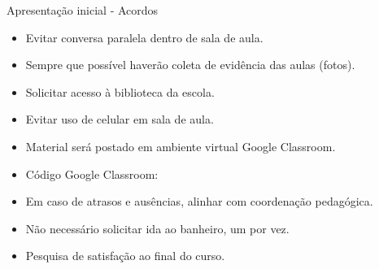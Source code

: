 
\begin{frame}{Apresentação inicial - Acordos}
    \begin{itemize}
        \item Evitar conversa paralela dentro de sala de aula.
        \item Sempre que possível haverão coleta de evidência das aulas (fotos).
        \item Solicitar acesso à biblioteca da escola.
        \item Evitar uso de celular em sala de aula.
        \item Material será postado em ambiente virtual Google Classroom.
        \item Código Google Classroom: 
        \item Em caso de atrasos e ausências, alinhar com coordenação pedagógica.
        \item Não necessário solicitar ida ao banheiro, um por vez.
        \item Pesquisa de satisfação ao final do curso.
    \end{itemize}
\end{frame}

